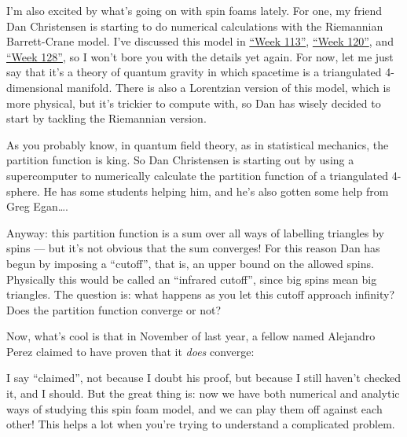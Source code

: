 \documentclass{article}
\def\tightlist{}
\renewcommand{\texttt}[1]{%
  \begingroup
  \ttfamily
  \begingroup\lccode`~=`/\lowercase{\endgroup\def~}{/\discretionary{}{}{}}%
  \begingroup\lccode`~=`[\lowercase{\endgroup\def~}{[\discretionary{}{}{}}%
  \begingroup\lccode`~=`.\lowercase{\endgroup\def~}{.\discretionary{}{}{}}%
  \catcode`/=\active\catcode`[=\active\catcode`.=\active
  \scantokens{#1\noexpand}%
  \endgroup
}
\begin{document}
I'm also excited by what's going on with spin foams lately. For one, my
friend Dan Christensen is starting to do numerical calculations with the
Riemannian Barrett-Crane model. I've discussed this model in
\protect\hyperlink{week113}{``Week 113''},
\protect\hyperlink{week120}{``Week 120''}, and
\protect\hyperlink{week128}{``Week 128''}, so I won't bore you with the
details yet again. For now, let me just say that it's a theory of
quantum gravity in which spacetime is a triangulated 4-dimensional
manifold. There is also a Lorentzian version of this model, which is
more physical, but it's trickier to compute with, so Dan has wisely
decided to start by tackling the Riemannian version.

As you probably know, in quantum field theory, as in statistical
mechanics, the partition function is king. So Dan Christensen is
starting out by using a supercomputer to numerically calculate the
partition function of a triangulated 4-sphere. He has some students
helping him, and he's also gotten some help from Greg Egan\ldots.

Anyway: this partition function is a sum over all ways of labelling
triangles by spins --- but it's not obvious that the sum converges! For
this reason Dan has begun by imposing a ``cutoff'', that is, an upper
bound on the allowed spins. Physically this would be called an
``infrared cutoff'', since big spins mean big triangles. The question
is: what happens as you let this cutoff approach infinity? Does the
partition function converge or not?

Now, what's cool is that in November of last year, a fellow named
Alejandro Perez claimed to have proven that it \emph{does} converge:


I say ``claimed'', not because I doubt his proof, but because I still
haven't checked it, and I should. But the great thing is: now we have
both numerical and analytic ways of studying this spin foam model, and
we can play them off against each other! This helps a lot when you're
trying to understand a complicated problem.
\end{document}
